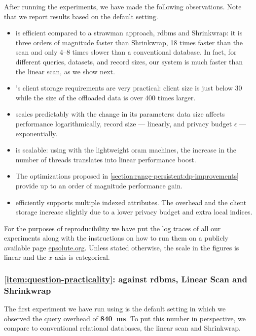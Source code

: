 		After running the experiments, we have made the following observations.
		Note that we report results based on the default setting.
		\begin{itemize}[leftmargin=*]
			\item
				\epsolute{} is efficient compared to a strawman approach, \acrshort{rdbms} and Shrinkwrap: it is three orders of magnitude faster than Shrinkwrap, 18 times faster than the scan and only 4--8 times slower than a conventional database.
				In fact, for different queries, datasets, and record sizes, our system is much faster than the linear scan, as we show next.
			\item
				\epsolute{}'s client storage requirements are very practical: client size is just below \SI{30}{\mega\byte} while the size of the offloaded data is over 400 times larger.
			\item
				\epsolute{} scales predictably with the change in its parameters: data size affects performance logarithmically, record size --- linearly, and privacy budget $\epsilon$ --- exponentially.
			\item
				\epsolute{} is scalable: using \protocolGamma{} with the lightweight \acrshort{oram} machines, the increase in the number of threads translates into linear performance boost.
			\item
				The optimizations proposed in \cref{section:range-persistent:dp-improvements} provide up to an order of magnitude performance gain.
			\item
				\epsolute{} efficiently supports multiple indexed attributes.
				The overhead and the client storage increase slightly due to a lower privacy budget and extra local indices.
		\end{itemize}

		For the purposes of reproducibility we have put the log traces of all our experiments along with the instructions on how to run them on a publicly available page \href{https://epsolute.org}{epsolute.org}.
		Unless stated otherwise, the scale in the figures is linear and the $x$-axis is categorical.

		\subsubsection*{\textbf{\texorpdfstring{\ref{item:question-practicality}:}{} against \acrshort{rdbms}, Linear Scan and Shrinkwrap}}

			

			The first experiment we have run using \epsolute{} is the default setting in which we observed the query overhead of \textbf{\SI[detect-all=true]{840}{\milli\second}}.
			To put this number in perspective, we compare \epsolute{} to conventional relational databases, the linear scan and Shrinkwrap.

